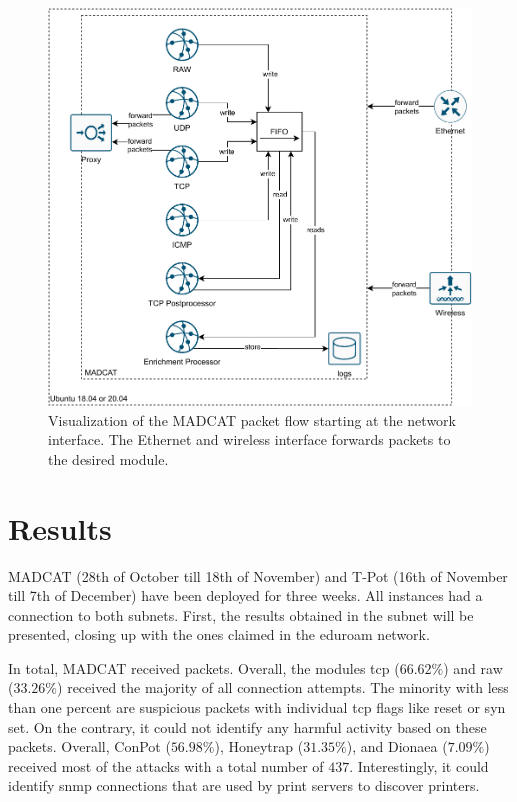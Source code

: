 \begin{figure}
    \centering
    \includegraphics[width=\textwidth]{figures/heicat-architecture.pdf}
    \caption[Visualization of the MADCAT packet flow]{
        Visualization of the MADCAT packet flow starting at the network interface.
        The Ethernet and wireless interface forwards packets to the desired module.
    }
    \label{fig:madcat-architecture}
\end{figure}

\section{Results}

MADCAT (28th of October till 18th of November) and T-Pot (16th of November till 7th of December) have been deployed for three weeks.
All instances had a connection to both subnets.
First, the results obtained in the subnet  will be presented, closing up with the ones claimed in the eduroam network.

In total, MADCAT received  packets.
Overall, the modules \ac{tcp} ($66.62\%$) and raw ($33.26\%$) received the majority of all connection attempts.
The minority with less than one percent are suspicious packets with individual \ac{tcp} flags like reset or syn set. 
On the contrary, it could not identify any harmful activity based on these packets.
Overall, ConPot ($56.98\%$), Honeytrap ($31.35\%$), and Dionaea ($7.09\%$) received most of the attacks with a total number of $437$.
Interestingly, it could identify \ac{snmp} connections that are used by print servers to discover printers.

